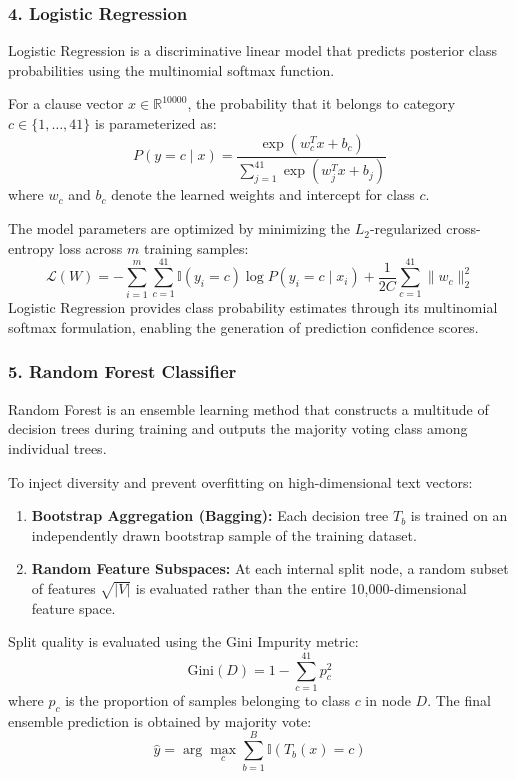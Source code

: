 \subsubsection*{4. Logistic Regression}
Logistic Regression is a discriminative linear model that predicts posterior class probabilities using the multinomial softmax function.

For a clause vector $x \in \mathbb{R}^{10000}$, the probability that it belongs to category $c \in \{1, \dots, 41\}$ is parameterized as:
\begin{equation}
    P(y = c \mid x) = \frac{\exp(w_c^T x + b_c)}{\sum_{j=1}^{41} \exp(w_j^T x + b_j)}
\end{equation}
where $w_c$ and $b_c$ denote the learned weights and intercept for class $c$.

The model parameters are optimized by minimizing the $L_2$-regularized cross-entropy loss across $m$ training samples:
\begin{equation}
    \mathcal{L}(W) = - \sum_{i=1}^{m} \sum_{c=1}^{41} \mathbb{I}(y_i = c) \log P(y_i = c \mid x_i) + \frac{1}{2C} \sum_{c=1}^{41} \|w_c\|_2^2
\end{equation}
Logistic Regression provides class probability estimates through its multinomial softmax formulation, enabling the generation of prediction confidence scores.

\subsubsection*{5. Random Forest Classifier}
Random Forest is an ensemble learning method that constructs a multitude of decision trees during training and outputs the majority voting class among individual trees.

To inject diversity and prevent overfitting on high-dimensional text vectors:
\begin{enumerate}
    \item \textbf{Bootstrap Aggregation (Bagging):} Each decision tree $T_b$ is trained on an independently drawn bootstrap sample of the training dataset.
    \item \textbf{Random Feature Subspaces:} At each internal split node, a random subset of features $\sqrt{|V|}$ is evaluated rather than the entire 10,000-dimensional feature space.
\end{enumerate}

Split quality is evaluated using the Gini Impurity metric:
\begin{equation}
    \text{Gini}(D) = 1 - \sum_{c=1}^{41} p_c^2
\end{equation}
where $p_c$ is the proportion of samples belonging to class $c$ in node $D$. The final ensemble prediction is obtained by majority vote:
\begin{equation}
    \hat{y} = \arg\max_c \sum_{b=1}^{B} \mathbb{I}(T_b(x) = c)
\end{equation}

